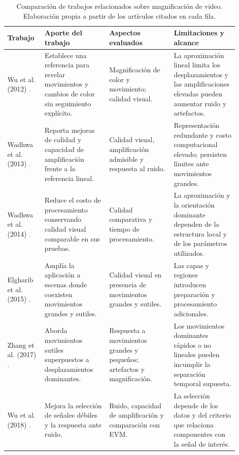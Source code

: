 \clearpage
\begin{table}[p]
\centering
\small
{}
\setlength{\tabcolsep}{4pt}
\renewcommand{\arraystretch}{1.15}
\caption{Comparación de trabajos relacionados sobre magnificación de video. Elaboración propia a partir de los artículos citados en cada fila.}
\label{tab:estado_arte}
\begin{tabular}{@{}>{\raggedright\arraybackslash}p{0.15\linewidth}>{\raggedright\arraybackslash}p{0.26\linewidth}>{\raggedright\arraybackslash}p{0.26\linewidth}>{\raggedright\arraybackslash}p{0.26\linewidth}@{}}
\toprule
Trabajo & Aporte del trabajo & Aspectos evaluados & Limitaciones y alcance \\
\midrule
Wu et al. (2012) \cite{wu2012eulerian}. & Establece una referencia para revelar movimientos y cambios de color sin seguimiento explícito. & Magnificación de color y movimiento; calidad visual. & La aproximación lineal limita los desplazamientos y las amplificaciones elevadas pueden aumentar ruido y artefactos. \\
Wadhwa et al. (2013) \cite{wadhwa2013phase}. & Reporta mejoras de calidad y capacidad de amplificación frente a la referencia lineal. & Calidad visual, amplificación admisible y respuesta al ruido. & Representación redundante y costo computacional elevado; persisten límites ante movimientos grandes. \\
Wadhwa et al. (2014) \cite{wadhwa2014riesz}. & Reduce el costo de procesamiento conservando calidad visual comparable en sus pruebas. & Calidad comparativa y tiempo de procesamiento. & La aproximación y la orientación dominante dependen de la estructura local y de los parámetros utilizados. \\
Elgharib et al. (2015) \cite{elgharib2015video}. & Amplía la aplicación a escenas donde coexisten movimientos grandes y sutiles. & Calidad visual en presencia de movimientos grandes y sutiles. & Las capas y regiones introducen preparación y procesamiento adicionales. \\
Zhang et al. (2017) \cite{zhang2017acceleration}. & Aborda movimientos sutiles superpuestos a desplazamientos dominantes. & Respuesta a movimientos grandes y pequeños; artefactos y magnificación. & Los movimientos dominantes rápidos o no lineales pueden incumplir la separación temporal supuesta. \\
Wu et al. (2018) \cite{wu2018pca}. & Mejora la selección de señales débiles y la respuesta ante ruido. & Ruido, capacidad de amplificación y comparación con EVM. & La selección depende de los datos y del criterio que relaciona componentes con la señal de interés. \\
\bottomrule
\end{tabular}
\end{table}
\clearpage

